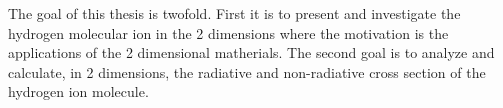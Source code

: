 
The goal of this thesis is twofold. First it is to present and investigate the hydrogen molecular ion in the 2 dimensions where the motivation is the applications of the 2 dimensional matherials.
The second goal is to analyze and calculate, in 2 dimensions, the radiative and non-radiative cross section of the hydrogen ion molecule.

